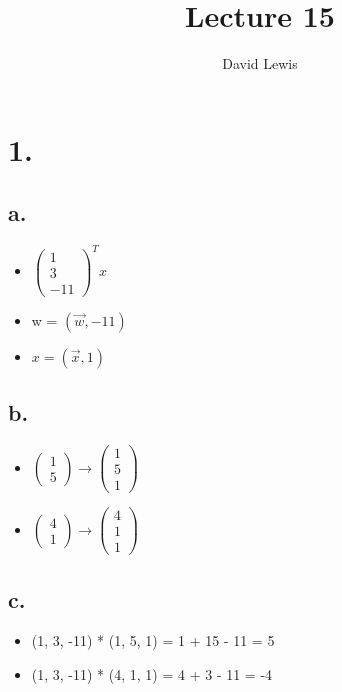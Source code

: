 \documentclass[11pt]{article}
\author{David Lewis}
\date{}
\title{Lecture 15}
\begin{document}
\maketitle
\section*{1.}
\label{sec:org6ccb18d}
\subsection*{a.}
\label{sec:org81b1273}
\begin{itemize}
\item \(\begin{pmatrix}1 \\ 3 \\ -11 \end{pmatrix}^Tx\)
\item w = \((\vec w, -11)\)
\item \(x = (\vec x, 1)\)
\end{itemize}
\subsection*{b.}
\label{sec:orge552d2c}
\begin{itemize}
\item \(\begin{pmatrix}1 \\ 5\end{pmatrix} \rightarrow \begin{pmatrix}1 \\ 5 \\ 1\end{pmatrix}\)
\item \(\begin{pmatrix}4 \\ 1\end{pmatrix} \rightarrow \begin{pmatrix}4 \\ 1 \\ 1\end{pmatrix}\)
\end{itemize}
\subsection*{c.}
\label{sec:org9bafd5a}
\begin{itemize}
\item (1, 3, -11) * (1, 5, 1) = 1 + 15 - 11 = 5
\item (1, 3, -11) * (4, 1, 1) = 4 + 3 - 11 = -4
\end{itemize}
\end{document}
